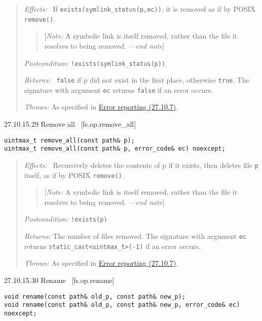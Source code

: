 \begin{quote}
\emph{Effects:}~ If \texttt{exists(symlink\_status(p,ec))}, it is
removed as if by POSIX \texttt{remove()}.

\begin{quote}
{[}\emph{Note:} A symbolic link is itself removed, rather than the file
it resolves to being removed. \emph{---end note}{]}
\end{quote}

\emph{Postcondition:} \texttt{!exists(symlink\_status(p))}.

\emph{Returns:}~ \texttt{false} if p did not exist in the first place,
otherwise \texttt{true}. The signature with argument \texttt{ec} returns
\texttt{false} if an error occurs.

\emph{Throws:} As specified in \hyperref[Error-reporting]{Error
reporting (27.10.7)}.
\end{quote}

27.10.15.29 Remove all~ {[}fs.op.remove\_all{]}

\begin{verbatim}
uintmax_t remove_all(const path& p);
uintmax_t remove_all(const path& p, error_code& ec) noexcept;
\end{verbatim}

\begin{quote}
\emph{Effects:}~ Recursively deletes the contents of p if it exists,
then deletes file \texttt{p} itself, as if by POSIX \texttt{remove()}.

\begin{quote}
{[}\emph{Note:} A symbolic link is itself removed, rather than the file
it resolves to being removed. \emph{---end note}{]}
\end{quote}

\emph{Postcondition:} \texttt{!exists(p)}

\emph{Returns:} The number of files removed. The signature with argument
\texttt{ec} returns
\texttt{static\_cast\textless{}uintmax\_t\textgreater{}(-1)} if an error
occurs.

\emph{Throws:} As specified in \hyperref[Error-reporting]{Error
reporting (27.10.7)}.
\end{quote}

27.10.15.30 Rename~ {[}fs.op.rename{]}

\begin{verbatim}
void rename(const path& old_p, const path& new_p);
void rename(const path& old_p, const path& new_p, error_code& ec) noexcept;
\end{verbatim}

